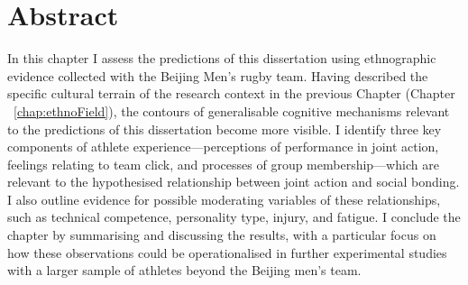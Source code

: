 
\chapter*{Abstract}





In this chapter I assess the predictions of this dissertation using ethnographic evidence collected with the Beijing Men's rugby team.  Having described the specific cultural terrain of the research context in the previous Chapter (Chapter ~\ref{chap:ethnoField}), the contours of generalisable cognitive mechanisms relevant to the predictions of this dissertation become more visible. I identify three key components of athlete experience---perceptions of performance in joint action, feelings relating to team click, and processes of group membership---which are relevant to the hypothesised relationship between joint action and social bonding.  I also outline evidence for possible moderating variables of these relationships, such as technical competence, personality type, injury, and fatigue.  I conclude the chapter by summarising and discussing the results, with a particular focus on how these observations could be operationalised in further experimental studies with a larger sample of athletes beyond the Beijing men's team.
